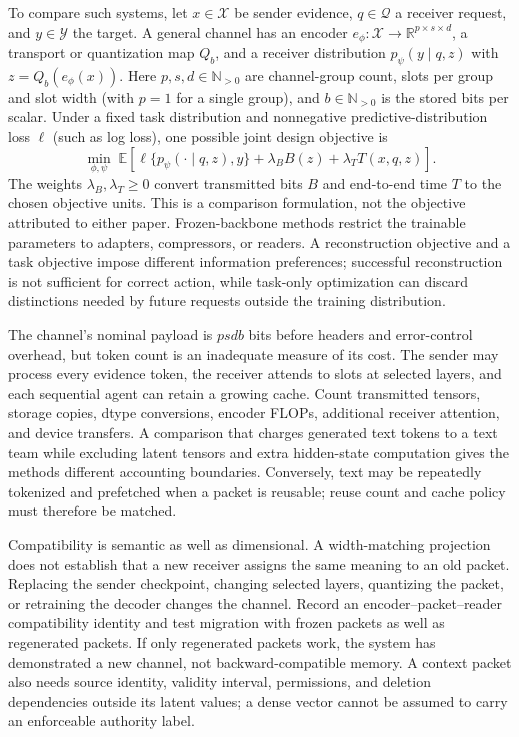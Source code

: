 To compare such systems, let $x\in\mathcal X$ be sender evidence, $q\in\mathcal Q$ a receiver request, and $y\in\mathcal Y$ the target. A general channel has an encoder $e_\phi:\mathcal X\rightarrow\mathbb R^{p\times s\times d}$, a transport or quantization map $Q_b$, and a receiver distribution $p_\psi(y\mid q,z)$ with $z=Q_b(e_\phi(x))$. Here $p,s,d\in\mathbb N_{>0}$ are channel-group count, slots per group and slot width (with $p=1$ for a single group), and $b\in\mathbb N_{>0}$ is the stored bits per scalar. Under a fixed task distribution and nonnegative predictive-distribution loss $\ell$ (such as log loss), one possible joint design objective is
\begin{equation}
 \min_{\phi,\psi}\;
 \mathbb E\!\left[\ell\{p_\psi(\cdot\mid q,z),y\}
 +\lambda_B B(z)+\lambda_T T(x,q,z)\right].
\end{equation}
The weights $\lambda_B,\lambda_T\geq0$ convert transmitted bits $B$ and end-to-end time $T$ to the chosen objective units. This is a comparison formulation, not the objective attributed to either paper. Frozen-backbone methods restrict the trainable parameters to adapters, compressors, or readers. A reconstruction objective and a task objective impose different information preferences; successful reconstruction is not sufficient for correct action, while task-only optimization can discard distinctions needed by future requests outside the training distribution.

The channel's nominal payload is $psdb$ bits before headers and error-control overhead, but token count is an inadequate measure of its cost. The sender may process every evidence token, the receiver attends to slots at selected layers, and each sequential agent can retain a growing cache. Count transmitted tensors, storage copies, dtype conversions, encoder FLOPs, additional receiver attention, and device transfers. A comparison that charges generated text tokens to a text team while excluding latent tensors and extra hidden-state computation gives the methods different accounting boundaries. Conversely, text may be repeatedly tokenized and prefetched when a packet is reusable; reuse count and cache policy must therefore be matched.

Compatibility is semantic as well as dimensional. A width-matching projection does not establish that a new receiver assigns the same meaning to an old packet. Replacing the sender checkpoint, changing selected layers, quantizing the packet, or retraining the decoder changes the channel. Record an encoder--packet--reader compatibility identity and test migration with frozen packets as well as regenerated packets. If only regenerated packets work, the system has demonstrated a new channel, not backward-compatible memory. A context packet also needs source identity, validity interval, permissions, and deletion dependencies outside its latent values; a dense vector cannot be assumed to carry an enforceable authority label.


